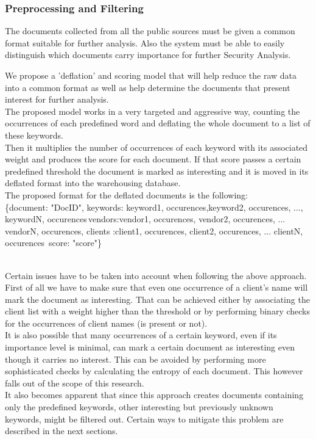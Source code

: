 \documentclass[12pt]{article}
\newcounter{subsubsubsection}[subsubsection]
\begin{document}
\newpage
\subsubsection{Preprocessing and Filtering}
The documents collected from all the public sources must be given a common format suitable for further analysis. Also the system must be able to easily distinguish which documents carry importance for further Security Analysis. 

We propose a 'deflation' and scoring model that will help reduce the raw data into a common format as well as help determine the documents that present interest for further analysis. 
\hfill \break\\
The proposed model works in a very targeted and aggressive way, counting the occurrences of each predefined word and deflating the whole document to a list of these keywords. 
\hfill \break\\
Then it multiplies the number of occurrences of each keyword with its associated weight and produces the score for each document. If that score passes a certain predefined threshold the document is marked as interesting and it is moved in its deflated format into the warehousing database. 
\hfill \break\\
The proposed format for the deflated documents is the following:\\

\{document: "DocID", keywords: \lbrack \lbrack keyword1, occurences\rbrack,\lbrack keyword2, occurences\rbrack, ..., \lbrack keywordN, occurences\rbrack \rbrack\,vendors:\lbrack\lbrack vendor1, occurences\rbrack, \lbrack vendor2, occurences\rbrack, ... \lbrack vendorN, occurences\rbrack  \rbrack, clients :\lbrack\lbrack client1, occurences\rbrack, \lbrack client2, occurences\rbrack, ... \lbrack clientN, occurences\rbrack  \rbrack\, score: "score"\}

\hfill \break\\
Certain issues have to be taken into account when following the above approach. First of all we have to make sure that even one occurrence of a client's name will mark the document as interesting. That can be achieved either by associating the client list with a weight higher than the threshold or by performing binary checks for the occurrences of client names (is present or not). 
\hfill \break\\
It is also possible that many occurrences of a certain keyword, even if its importance level is minimal, can mark a certain document as interesting even though it carries no interest. This can be avoided by performing more sophisticated checks by calculating the entropy of each document. This however falls out of the scope of this research.
\hfill \break\\
It also becomes apparent that since this approach creates documents containing only the predefined keywords, other interesting but previously unknown keywords, might be filtered out. Certain ways to mitigate this problem are described in the next sections. 
\end{document}
